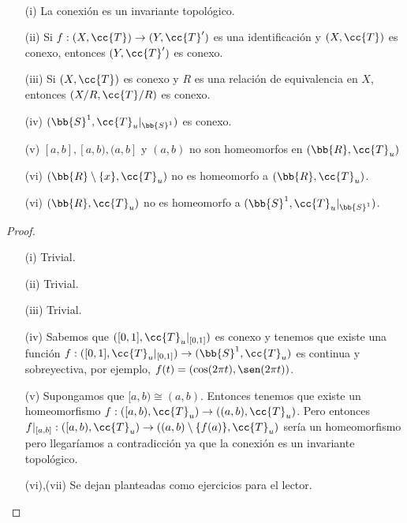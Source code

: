 \begin{coro}\
    \begin{enumerate}
        \item[(i)] La conexión es un invariante topológico.
        \item[(ii)] Si $f:(X, \cc{T})\to (Y, \cc{T}')$ es una identificación y $(X, \cc{T})$ es conexo, entonces $(Y, \cc{T}')$ es conexo.
        \item[(iii)] Si $(X, \cc{T})$ es conexo y $R$ es una relación de equivalencia en $X$, entonces $(X/R, \cc{T}/R)$ es conexo.
        \item[(iv)] $(\bb{S}^1, \cc{T}_u|_{\bb{S}^1})$ es conexo.
        \item[(v)] $[a,b], [a,b), (a,b]$ y $(a,b)$ no son homeomorfos en $(\bb{R}, \cc{T}_u)$ 
        \item[(vi)] $(\bb{R}\setminus \{x\}, \cc{T}_u)$ no es homeomorfo a $(\bb{R}, \cc{T}_u)$.
        \item[(vi)] $(\bb{R}, \cc{T}_u)$ no es homeomorfo a $(\bb{S}^1, \cc{T}_u|_{\bb{S}^1})$.  
    \end{enumerate}
    \begin{proof}\
        \begin{enumerate}
            \item[(i)] Trivial.
            \item[(ii)] Trivial.
            \item[(iii)] Trivial.
            \item[(iv)] Sabemos que $([0,1], \cc{T}_u|_{[0,1]})$ es conexo y tenemos que existe una función $f:([0,1], \cc{T}_u|_{[0,1]})\to (\bb{S}^1, \cc{T}_u)$ es continua y sobreyectiva, por ejemplo, $f(t)=(\cos(2\pi t), \sen(2\pi t))$.
            \item[(v)] Supongamos que $[a,b)\cong(a,b)$. Entonces tenemos que existe un homeomorfismo $f:([a,b), \cc{T}_u)\to ((a,b), \cc{T}_u)$. Pero entonces $f|_{[a,b]}:([a,b), \cc{T}_u)\to ((a,b)\setminus \{f(a)\}, \cc{T}_u)$ sería un homeomorfismo pero llegaríamos a contradicción ya que la conexión es un invariante topológico.
            \item[(vi),(vii)] Se dejan planteadas como ejercicios para el lector.  
        \end{enumerate}
    \end{proof}
\end{coro}

